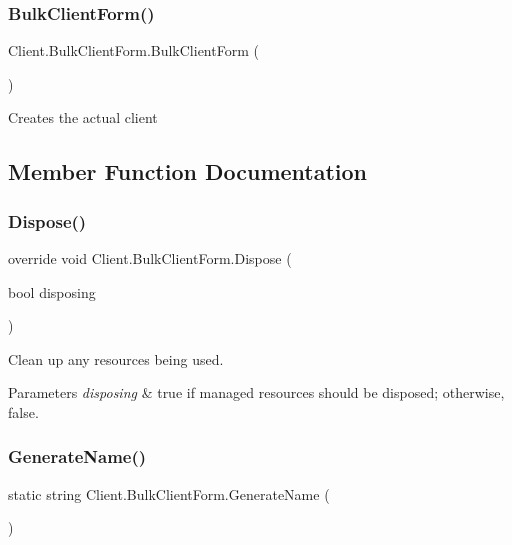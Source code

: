 \subsubsection{\texorpdfstring{Bulk\+Client\+Form()}{BulkClientForm()}}
{\footnotesize\ttfamily Client.\+Bulk\+Client\+Form.\+Bulk\+Client\+Form (\begin{DoxyParamCaption}{ }\end{DoxyParamCaption})}



Creates the actual client 



\subsection{Member Function Documentation}
\mbox{\label{class_client_1_1_bulk_client_form_a36e09756179becfcc35fa8c09fa8c738}} 
\subsubsection{\texorpdfstring{Dispose()}{Dispose()}}
{\footnotesize\ttfamily override void Client.\+Bulk\+Client\+Form.\+Dispose (\begin{DoxyParamCaption}\item[{bool}]{disposing }\end{DoxyParamCaption})\hspace{0.3cm}{\ttfamily [protected]}}



Clean up any resources being used. 


\begin{DoxyParams}{Parameters}
{\em disposing} & true if managed resources should be disposed; otherwise, false.\\
\hline
\end{DoxyParams}
\mbox{\label{class_client_1_1_bulk_client_form_a14a353ff4bb98da49fb665a02108aab4}} 
\subsubsection{\texorpdfstring{Generate\+Name()}{GenerateName()}}
{\footnotesize\ttfamily static string Client.\+Bulk\+Client\+Form.\+Generate\+Name (\begin{DoxyParamCaption}{ }\end{DoxyParamCaption})\hspace{0.3cm}{\ttfamily [static]}}




